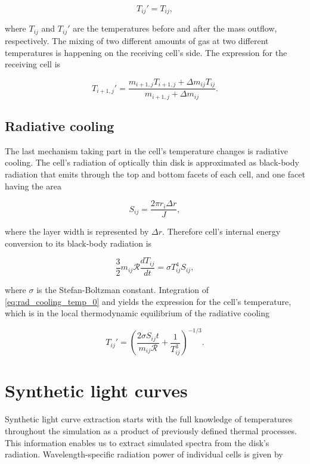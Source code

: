     \begin{equation}
    T_{ij}' = T_{ij},
    \end{equation}

    where $T_{ij}$ and $T_{ij}'$ are the temperatures before and after the mass outflow, respectively. The mixing of two different amounts of gas at two different temperatures is happening on the receiving cell's side. The expression for the receiving cell is

    \begin{equation}
    T_{i+1,j}' = \frac{m_{i+1,j} T_{i+1,j} + \Delta m_{ij} T_{ij}}{m_{i+1,j} + \Delta m_{ij}}.
    \end{equation}

\subsection{Radiative cooling}
    The last mechanism taking part in the cell's temperature changes is radiative cooling. The cell's radiation of optically thin disk is approximated as black-body radiation that emits through the top and bottom facets of each cell, and one facet having the area

    \begin{equation}
        S_{ij} = \frac{2 \pi r_i \Delta r}{J},
        \label{eq:facet_area}
    \end{equation}

    where the layer width is represented by $\Delta r$. Therefore cell's internal energy conversion to its black-body radiation is

    \begin{equation}
        \frac{3}{2} m_{ij} \mathcal{R} \frac{dT_{ij}}{dt} = \sigma T_{ij}^4 S_{ij},
        \label{eq:rad_cooling_temp_0}
    \end{equation}

    where $\sigma$ is the Stefan-Boltzman constant. Integration of \eqref{eq:rad_cooling_temp_0} and yields the expression for the cell's temperature, which is in the local thermodynamic equilibrium of the radiative cooling

    \begin{equation}
    T_{ij}' = \left( \frac{2 \sigma S_{ij} t}{m_{ij} \mathcal{R}} + \frac{1}{T_{ij}^3} \right)^{-1/3}.
    \end{equation}

\section{Synthetic light curves}
    Synthetic light curve extraction starts with the full knowledge of temperatures throughout the simulation as a product of previously defined thermal processes. This information enables us to extract simulated spectra from the disk's radiation. Wavelength-specific radiation power of individual cells is given by

